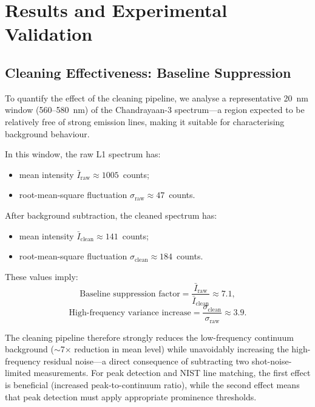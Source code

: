 \documentclass[a4paper,twocolumn,10pt]{article}
\begin{document}
\section{Results and Experimental Validation}
\label{sec:results}

\subsection{Cleaning Effectiveness: Baseline Suppression}

To quantify the effect of the cleaning pipeline, we analyse a
representative 20~nm window (560--580~nm) of the Chandrayaan-3
spectrum---a region expected to be relatively free of strong emission
lines, making it suitable for characterising background behaviour.

In this window, the raw L1 spectrum has:
\begin{itemize}[nosep,leftmargin=*]
  \item mean intensity $\bar{I}_{\text{raw}} \approx 1005$~counts;
  \item root-mean-square fluctuation
    $\sigma_{\text{raw}} \approx 47$~counts.
\end{itemize}

After background subtraction, the cleaned spectrum has:
\begin{itemize}[nosep,leftmargin=*]
  \item mean intensity $\bar{I}_{\text{clean}} \approx 141$~counts;
  \item root-mean-square fluctuation
    $\sigma_{\text{clean}} \approx 184$~counts.
\end{itemize}

These values imply:
\begin{equation}
\text{Baseline suppression factor} =
  \frac{\bar{I}_{\text{raw}}}{\bar{I}_{\text{clean}}} \approx 7.1,
\end{equation}
\begin{equation}
\text{High-frequency variance increase} =
  \frac{\sigma_{\text{clean}}}{\sigma_{\text{raw}}} \approx 3.9.
\end{equation}

The cleaning pipeline therefore strongly reduces the low-frequency
continuum background ($\sim$7$\times$ reduction in mean level) while
unavoidably increasing the high-frequency residual noise---a direct
consequence of subtracting two shot-noise-limited measurements.
For peak detection and NIST line matching, the first effect is
beneficial (increased peak-to-continuum ratio), while the second
effect means that peak detection must apply appropriate prominence
thresholds.
\end{document}
